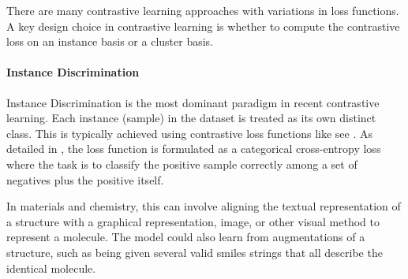 There are many contrastive learning approaches with variations in loss functions. A key design choice in contrastive learning is whether to compute the contrastive loss on an instance basis or a cluster basis.


\paragraph{Instance Discrimination}
\label{sec:instance_discrimination}
Instance Discrimination is the most dominant paradigm in recent contrastive learning.
Each instance (sample) in the dataset is treated as its own distinct class.  
This is typically achieved using contrastive loss functions like  see . \autocite{oord2018representation} As detailed in , the loss function is formulated as a categorical cross-entropy loss where the task is to classify the positive sample correctly among a set of negatives plus the positive itself.

In materials and chemistry, this can involve aligning the textual representation of a structure with a graphical representation, image, or other visual method to represent a molecule.\autocite{seidl2023enhancing}
The model could also learn from augmentations of a structure, such as being given several valid \gls{smiles} strings that all describe the identical molecule. 


